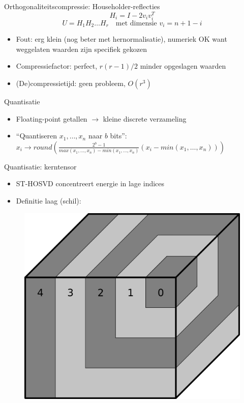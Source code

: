 \documentclass[t,12pt,dutch
\ifx\beamermode\undefined\else,\beamermode\fi
]{beamer}
\begin{document}
\begin{frame}{Orthogonaliteitscompressie: Householder-reflecties}
\[
H_i = I - 2 v_i v_i^T
\]
\[
U = H_1 H_2 \dots H_r \quad \text{met dimensie } v_i = n + 1 - i
\]
\begin{itemize}
\item Fout: erg klein (nog beter met hernormalisatie), numeriek OK want weggelaten waarden zijn specifiek gekozen
\item Compressiefactor: perfect, $r (r - 1)/2$ minder opgeslagen waarden
\item (De)compressietijd: geen probleem, $O(r^3)$
\end{itemize}
\end{frame}

\begin{frame}{Quantisatie}
\begin{itemize}
\item Floating-point getallen $\rightarrow$ kleine discrete verzameling
\item ``Quantiseren $x_1, \dots, x_n$ naar $b$ bits'':\\
$x_i \rightarrow round(\frac{2^b - 1}{max(x_1, \dots, x_n) - min(x_1, \dots, x_n)} (x_i - min(x_1, \dots, x_n)))$
\end{itemize}
\end{frame}

\begin{frame}{Quantisatie: kerntensor}

\begin{itemize}
\item ST-HOSVD concentreert energie in lage indices
\item Definitie laag (schil):
\end{itemize}

\begin{figure}[H]
\centering
\includegraphics[scale=0.6]{images/core_tensor_layers.png}
\end{figure}

\end{frame}
\end{document}
